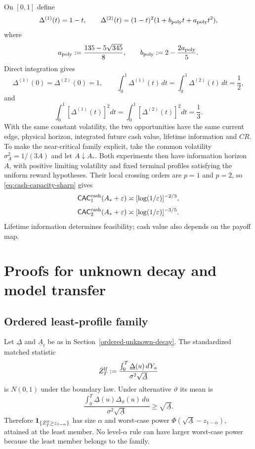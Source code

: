\documentclass[11pt]{article}
\numberwithin{equation}{section}
\theoremstyle{plain}
\theoremstyle{definition}
\theoremstyle{remark}
\begin{document}
On $[0,1]$ define
\[
\Delta^{(1)}(t)=1-t,
\qquad
\Delta^{(2)}(t)=(1-t)^2(1+b_{\rm poly}t+a_{\rm poly}t^2),
\]
where
\[
a_{\rm poly}:=\frac{135-5\sqrt{345}}8,
\qquad
b_{\rm poly}:=2-\frac{2a_{\rm poly}}5.
\]
Direct integration gives
\[
\Delta^{(1)}(0)=\Delta^{(2)}(0)=1,
\qquad
\int_0^1\Delta^{(1)}(t)\,dt
=
\int_0^1\Delta^{(2)}(t)\,dt
=\frac12,
\]
and
\[
\int_0^1[\Delta^{(1)}(t)]^2dt
=
\int_0^1[\Delta^{(2)}(t)]^2dt
=\frac13.
\]
With the same constant volatility, the two opportunities have the same
current edge, physical horizon, integrated future cash value, lifetime
information and $CR$. To make the near-critical family explicit, take the
common volatility $\sigma_A^2=1/(3A)$ and let $A\downarrow A_*$. Both
experiments then have information horizon $A$, with positive limiting
volatility and fixed terminal profiles satisfying the uniform reward
hypotheses. Their local crossing orders are $p=1$ and $p=2$, so \eqref{eq:cash-capacity-sharp} gives
\[
\mathsf{CAC}^{\rm cash}_{1}(A_*+\varepsilon)
\asymp[\log(1/\varepsilon)]^{-2/3},
\]
\[
\mathsf{CAC}^{\rm cash}_{2}(A_*+\varepsilon)
\asymp[\log(1/\varepsilon)]^{-3/5}.
\]
Lifetime information determines feasibility; cash value also depends on the payoff map.

\section{Proofs for unknown decay and model transfer}\label{app:unknown-decay-proofs}

\subsection{Ordered least-profile family}

Let $\underline\Delta$ and $\underline A_t$ be as in Section~\ref{ordered-unknown-decay}.  The standardized matched statistic
\[
\bar Z_T^{\rm lf}
:=
\frac{\int_0^T\underline\Delta(u)\,dY_u}
{\sigma^2\sqrt{\underline A}}
\]
is $N(0,1)$ under the boundary law.  Under alternative $\vartheta$ its mean is
\[
\frac{\int_0^T\underline\Delta(u)\Delta_\vartheta(u)\,du}
{\sigma^2\sqrt{\underline A}}
\ge\sqrt{\underline A}.
\]
Therefore $\mathbf1_{\{\bar Z_T^{\rm lf}\ge z_{1-\alpha}\}}$ has size $\alpha$ and worst-case power
$\Phi(\sqrt{\underline A}-z_{1-\alpha})$, attained at the least member.  No level-$\alpha$ rule can have larger worst-case power because the least member belongs to the family.
\end{document}
